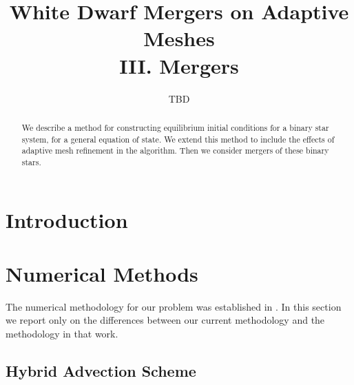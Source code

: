 \documentclass[twocolumn,numberedappendix]{../aastex60}
\begin{document}
\title{White Dwarf Mergers on Adaptive Meshes\\ III. Mergers}


\author{TBD}
\begin{abstract}
We describe a method for constructing equilibrium initial conditions for a binary star system,
for a general equation of state. We extend this method to include the effects of adaptive
mesh refinement in the algorithm. Then we consider mergers of these binary stars.

\end{abstract}

\section{Introduction}




\section{Numerical Methods}
\label{sec:methodology}

The numerical methodology for our problem was established in \cite{wdmergerI}.
In this section we report only on the differences between our current methodology
and the methodology in that work.

\subsection{Hybrid Advection Scheme}
\label{sec:hybrid}
\end{document}
